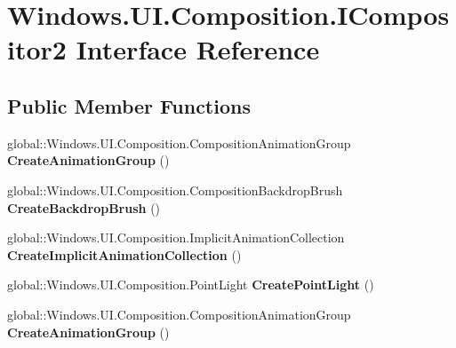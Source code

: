 \hypertarget{interface_windows_1_1_u_i_1_1_composition_1_1_i_compositor2}{}\section{Windows.\+U\+I.\+Composition.\+I\+Compositor2 Interface Reference}
\label{interface_windows_1_1_u_i_1_1_composition_1_1_i_compositor2}
\subsection*{Public Member Functions}
\begin{DoxyCompactItemize}
\item 
\mbox{\label{interface_windows_1_1_u_i_1_1_composition_1_1_i_compositor2_a614654ecc2c1a3a0a9f0535586ebd659}} 
global\+::\+Windows.\+U\+I.\+Composition.\+Composition\+Animation\+Group {\bfseries Create\+Animation\+Group} ()
\item 
\mbox{\label{interface_windows_1_1_u_i_1_1_composition_1_1_i_compositor2_a61d8976607a1d3faed1024dadc930f51}} 
global\+::\+Windows.\+U\+I.\+Composition.\+Composition\+Backdrop\+Brush {\bfseries Create\+Backdrop\+Brush} ()
\item 
\mbox{\label{interface_windows_1_1_u_i_1_1_composition_1_1_i_compositor2_aac0cda04e2ab2c9d4a7a2c56f5a5cc70}} 
global\+::\+Windows.\+U\+I.\+Composition.\+Implicit\+Animation\+Collection {\bfseries Create\+Implicit\+Animation\+Collection} ()
\item 
\mbox{\label{interface_windows_1_1_u_i_1_1_composition_1_1_i_compositor2_af9017b48335a947750d1075cf206c777}} 
global\+::\+Windows.\+U\+I.\+Composition.\+Point\+Light {\bfseries Create\+Point\+Light} ()
\item 
\mbox{\label{interface_windows_1_1_u_i_1_1_composition_1_1_i_compositor2_a614654ecc2c1a3a0a9f0535586ebd659}} 
global\+::\+Windows.\+U\+I.\+Composition.\+Composition\+Animation\+Group {\bfseries Create\+Animation\+Group} ()

\end{DoxyCompactItemize}
